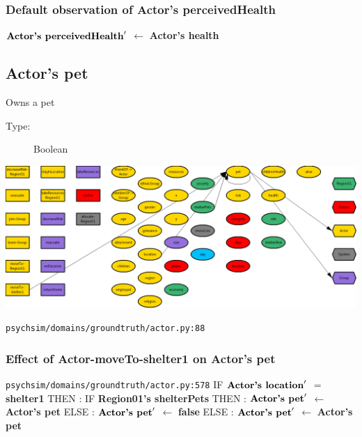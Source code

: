 \documentclass{article}%
\begin{document}
\subsubsection{Default observation of Actor's perceivedHealth}%
\label{ssubsec:Default observation of Actor's perceivedHealth}%
\begin{flushleft}%
$\mbox{\textbf{Actor's perceivedHealth}} '$%
$\leftarrow$%
\textbf{Actor's health}%
\end{flushleft}

%
\subsection{Actor's pet}%
\label{subsec:Actor's pet}%
Owns a pet%
\begin{description}%
\item[Type:]%
Boolean%
\end{description}%
\includegraphics[width=\textwidth]{images/petOfActor.png}%
\begin{flushleft}%
\verb|psychsim/domains/groundtruth/actor.py:88|%
\end{flushleft}%
\subsubsection{Effect of Actor{-}moveTo{-}shelter1 on Actor's pet}%
\label{ssubsec:Effect of Actor{-}moveTo{-}shelter1 on Actor's pet}%
\begin{flushleft}%
\verb|psychsim/domains/groundtruth/actor.py:578|%
\linebreak%
IF %
$\mbox{\textbf{Actor's location}} '$%
$=$%
\textbf{shelter1}%
\linebreak%
\hspace*{2em}%
THEN %
: %
IF %
\textbf{Region01's shelterPets}%
\linebreak%
\hspace*{4em}%
THEN %
: %
$\mbox{\textbf{Actor's pet}} '$%
$\leftarrow$%
\textbf{Actor's pet}%
\linebreak%
\hspace*{4em}%
ELSE %
: %
$\mbox{\textbf{Actor's pet}} '$%
$\leftarrow$%
\textbf{false}%
\linebreak%
\hspace*{2em}%
ELSE %
: %
$\mbox{\textbf{Actor's pet}} '$%
$\leftarrow$%
\textbf{Actor's pet}%
\end{flushleft}
\end{document}
